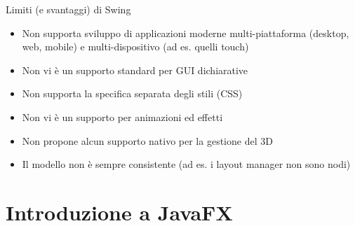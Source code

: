 \documentclass[xcolor=dvipsnames,presentation]{beamer}
\begin{document}
\begin{frame}{Limiti (e svantaggi) di Swing}
\begin{itemize}\itemsep10pt
\item Non supporta sviluppo di applicazioni moderne multi-piattaforma (desktop, web, mobile) e multi-dispositivo (ad es. quelli touch)
\item Non vi è un supporto standard per GUI dichiarative
\item Non supporta la specifica separata degli stili (CSS)
\item Non vi è un supporto per animazioni ed effetti
\item Non propone alcun supporto nativo per la gestione del 3D
\item Il modello non è sempre consistente (ad es. i layout manager non sono nodi)
\end{itemize}
\end{frame}

\section{Introduzione a JavaFX}
\end{document}
